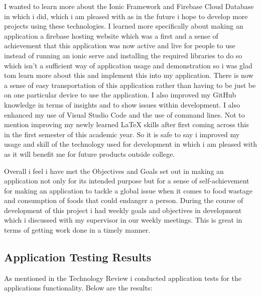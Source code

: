 I wanted to learn more about the Ionic Framework and Firebase Cloud Database in which i did, which i am pleased with as in the future i hope to develop more projects using these technologies. I learned more specifically about making an application a firebase hosting website which was a first and a sense of achievement that this application was now active and live for people to use instead of running an ionic serve and installing the required libraries to do so which isn't a sufficient way of application usage and demonstration so i was glad tom learn more about this and implement this into my application. There is now a sense of easy transportation of this application rather than having to be just be on one particular device to use the application. I also improved my GitHub knowledge in terms of insights and to show issues within development. I also enhanced my use of Visual Studio Code and the use of command lines. Not to mention improving my newly learned LaTeX skills after first coming across this in the first semester of this academic year. So it is safe to say i improved my usage and skill of the technology used for development in which i am pleased with as it will benefit me for future products outside college. 
\newline

Overall i feel i have met the Objectives and Goals set out in making an application not only for its intended purpose but for a sense of self-achievement for making an application to tackle a global issue when it comes to food wastage and consumption of foods that could endanger a person. During the course of development of this project i had weekly goals and objectives in development which i discussed with my supervisor in our weekly meetings. This is great in terms of getting work done in a timely manner.

\subsection{Application Testing Results}
As mentioned in the Technology Review i conducted application tests for the applications functionality. Below are the results:

